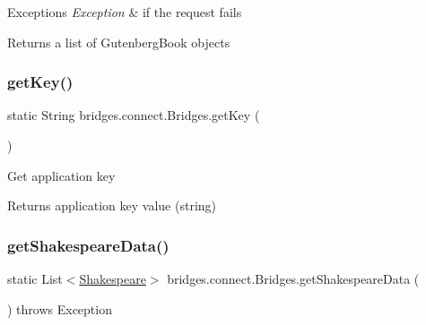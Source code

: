 \begin{DoxyExceptions}{Exceptions}
{\em Exception} & if the request fails\\
\hline
\end{DoxyExceptions}
\begin{DoxyReturn}{Returns}
a list of Gutenberg\+Book objects 
\end{DoxyReturn}
\mbox{\label{classbridges_1_1connect_1_1_bridges_a426897d6e5449601bb4e20c32b8346f5}} 
\subsubsection{\texorpdfstring{get\+Key()}{getKey()}}
{\footnotesize\ttfamily static String bridges.\+connect.\+Bridges.\+get\+Key (\begin{DoxyParamCaption}{ }\end{DoxyParamCaption})\hspace{0.3cm}{\ttfamily [static]}}

Get application key

\begin{DoxyReturn}{Returns}
application key value (string) 
\end{DoxyReturn}
\mbox{\label{classbridges_1_1connect_1_1_bridges_adc8d19f28677afb03db53736455de2d0}} 
\subsubsection{\texorpdfstring{get\+Shakespeare\+Data()}{getShakespeareData()}\hspace{0.1cm}{\footnotesize\ttfamily [1/3]}}
{\footnotesize\ttfamily static List$<$\mbox{\hyperlink{classbridges_1_1data__src__dependent_1_1_shakespeare}{Shakespeare}}$>$ bridges.\+connect.\+Bridges.\+get\+Shakespeare\+Data (\begin{DoxyParamCaption}{ }\end{DoxyParamCaption}) throws Exception\hspace{0.3cm}{\ttfamily [static]}}


